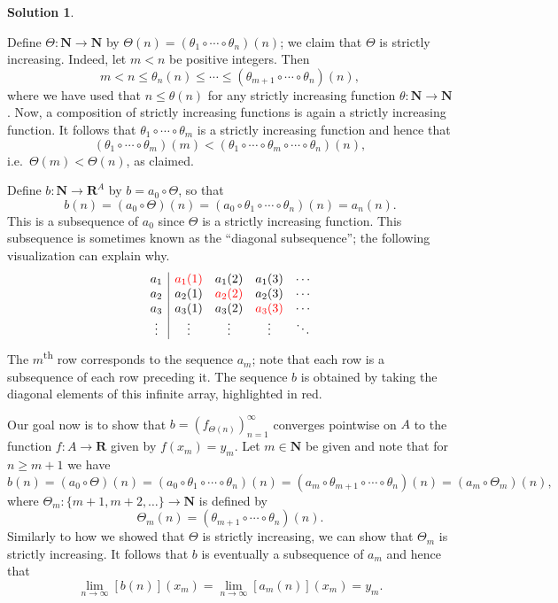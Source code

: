\documentclass[12pt]{article}
\theoremstyle{definition}
\theoremstyle{exercise}
\theoremstyle{solution}
\newtheorem*{solution}{Solution}
\newcommand{\ts}{\textsuperscript}
\newcommand{\N}{\mathbf{N}}
\newcommand{\R}{\mathbf{R}}
\begin{document}
\begin{solution}
\begin{enumerate}
        Define \( \Theta : \N \to \N \) by \( \Theta(n) = (\theta_1 \circ \cdots \circ \theta_n)(n) \); we claim that \( \Theta \) is strictly increasing. Indeed, let \( m < n \) be positive integers. Then
        \[
            m < n \leq \theta_n(n) \leq \cdots \leq (\theta_{m+1} \circ \cdots \circ \theta_n)(n),
        \]
        where we have used that \( n \leq \theta(n) \) for any strictly increasing function \( \theta : \N \to \N \). Now, a composition of strictly increasing functions is again a strictly increasing function. It follows that \( \theta_1 \circ \cdots \circ \theta_m \) is a strictly increasing function and hence that
        \[
            (\theta_1 \circ \cdots \circ \theta_m)(m) < (\theta_1 \circ \cdots \circ \theta_m \circ \cdots \circ \theta_n)(n),
        \]
        i.e.\ \( \Theta(m) < \Theta(n) \), as claimed.

        Define \( b : \N \to \R^A \) by \( b = a_0 \circ \Theta \), so that
        \[
            b(n) = (a_0 \circ \Theta)(n) = (a_0 \circ \theta_1 \circ \cdots \circ \theta_n)(n) = a_n(n).
        \]
        This is a subsequence of \( a_0 \) since \( \Theta \) is a strictly increasing function. This subsequence is sometimes known as the ``diagonal subsequence''; the following visualization can explain why.
        \[
            \begin{array}{c|cccc}
                a_1 & \textcolor{red}{a_1(1)} & a_1(2) & a_1(3) & \cdots \\
                a_2 & a_2(1) & \textcolor{red}{a_2(2)} & a_2(3) & \cdots \\
                a_3 & a_3(1) & a_3(2) & \textcolor{red}{a_3(3)} & \cdots \\
                \vdots & \vdots & \vdots & \vdots & \ddots
            \end{array}
        \]
        The \( m \)\ts{th} row corresponds to the sequence \( a_m \); note that each row is a subsequence of each row preceding it. The sequence \( b \) is obtained by taking the diagonal elements of this infinite array, highlighted in red.
        
        Our goal now is to show that \( b = (f_{\Theta(n)})_{n=1}^{\infty} \) converges pointwise on \( A \) to the function \( f : A \to \R \) given by \( f(x_m) = y_m \). Let \( m \in \N \) be given and note that for \( n \geq m + 1 \) we have
        \[
            b(n) = (a_0 \circ \Theta)(n) = (a_0 \circ \theta_1 \circ \cdots \circ \theta_n)(n) = (a_m \circ \theta_{m+1} \circ \cdots \circ \theta_n)(n) = (a_m \circ \Theta_m)(n),
        \]
        where \( \Theta_m : \{ m + 1, m + 2, \ldots \} \to \N \) is defined by
        \[
            \Theta_m(n) = (\theta_{m+1} \circ \cdots \circ \theta_n)(n).
        \]
        Similarly to how we showed that \( \Theta \) is strictly increasing, we can show that \( \Theta_m \) is strictly increasing. It follows that \( b \) is eventually a subsequence of \( a_m \) and hence that
        \[
            \lim_{n \to \infty} [b(n)](x_m) = \lim_{n \to \infty} [a_m(n)](x_m) = y_m.
        \]
    \end{enumerate}
\end{solution}
\end{document}
